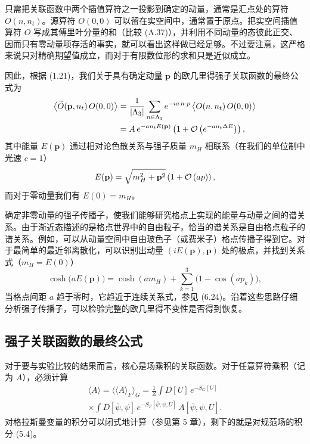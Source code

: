 只需把关联函数中两个插值算符之一投影到确定的动量，通常是汇点处的算符 $O(n, n_t)$。源算符 $O(0, 0)$ 可以留在实空间中，通常置于原点。把实空间插值算符 $O$ 写成其傅里叶分量的和（比较 (A.37)），并利用不同动量的态彼此正交、因而只有零动量项存活的事实，就可以看出这样做已经足够。不过要注意，这严格来说只对精确期望值成立，而对于有限数位形的求和只是近似成立。

因此，根据 (1.21)，我们关于具有确定动量 $\mathbf{p}$ 的欧几里得强子关联函数的最终公式为
\begin{equation}
  \begin{split}
    \big\langle \widetilde{O}(\mathbf{p}, n_t)\, O(0, 0) \big\rangle
    &= \frac{1}{|\Lambda_3|}\sum_{n\in\Lambda_3} e^{-\imath a\, n\cdot p}\,
       \big\langle O(n, n_t)\, O(0, 0) \big\rangle \\
    &= A\, e^{-a n_t E(\mathbf{p})}\left( 1 + \mathcal{O}\left(e^{-a n_t \Delta E}\right)
       \right),
  \end{split}
\end{equation}
其中能量 $E(\mathbf{p})$ 通过相对论色散关系与强子质量 $m_H$ 相联系（在我们的单位制中光速 $c = 1$）
\begin{equation}
  E(\mathbf{p}) = \sqrt{m_H^2 + \mathbf{p}^2}\left( 1 + \mathcal{O}\left(ap\right) \right),
\end{equation}
而对于零动量我们有 $E(0) = m_H$。

确定非零动量的强子传播子，使我们能够研究格点上实现的能量与动量之间的谱关系。由于渐近态描述的是格点世界中的自由粒子，恰当的谱关系是自由格点粒子的谱关系。例如，可以从动量空间中自由玻色子（或费米子）格点传播子得到它。对于最简单的最近邻离散化，可以识别出动量 $(iE(\mathbf{p}), \mathbf{p})$ 处的极点，并找到关系式（$m_H = E(0)$）
\begin{equation}
  \cosh\bigl(a E(\mathbf{p})\bigr) = \cosh(a m_H)
    + \sum_{k=1}^{3} \bigl( 1 - \cos(a p_k) \bigr) ,
\end{equation}
当格点间距 $a$ 趋于零时，它趋近于连续关系式，参见 (6.24)。沿着这些思路仔细分析强子传播子，可以检验完整的欧几里得不变性是否得到恢复。

\subsection{强子关联函数的最终公式}

对于要与实验比较的结果而言，核心是场乘积的关联函数。对于任意算符乘积（记为 $A$），必须计算
\begin{multline}
  \langle A\rangle = \big\langle \langle A\rangle_F \big\rangle_G
  = \frac{1}{Z}\int D[U]\, e^{-S_G[U]} \\
  \times \int D[\bar\psi,\psi]\, e^{-S_F[\bar\psi,\psi,U]}\,
    A[\bar\psi,\psi,U] .
\end{multline}
对格拉斯曼变量的积分可以闭式地计算（参见第 5 章），剩下的就是对规范场的积分 (5.4)。

